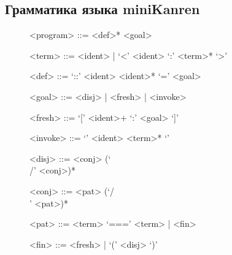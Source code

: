 \begin{appendices}

\section{Грамматика языка miniKanren}
\label{appendix:mk:grammar}

\begin{figure}[!h]
\begin{boxedminipage}{\linewidth}
\begin{grammar}

<program> ::= <def>* <goal>

<term> ::= <ident> | `<' <ident> `:' <term>* `>'

<def> ::= `::' <ident> <ident>* `=' <goal>

<goal> ::= <disj> | <fresh> | <invoke>

<fresh> ::= `[' <ident>+ `:' <goal> `]'

<invoke> ::= `{' <ident> <term>* `}'

<disj> ::= <conj> (`\\/' <conj>)*

<conj> ::= <pat> (`/\\' <pat>)*

<pat> ::= <term> `===' <term> | <fin>

<fin> ::= <fresh> | `(' <disj> `)'

\end{grammar}
\end{boxedminipage}
\end{figure}

\end{appendices}
